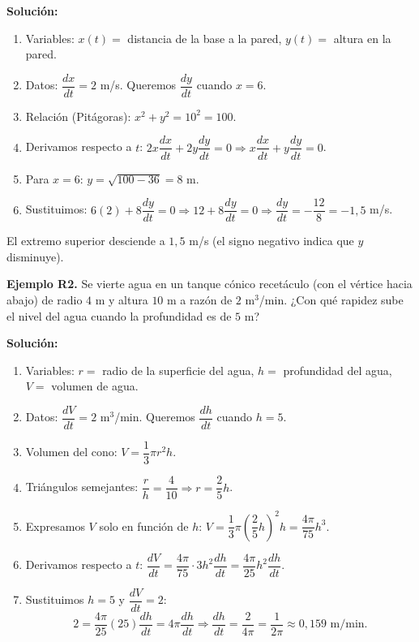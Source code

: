 \documentclass[12pt, letterpaper]{article}
\begin{document}
\begin{cuadrosolucion}
  \textbf{Solución:}
  \begin{enumerate}
    \item Variables: $x(t) =$ distancia de la base a la pared, $y(t) =$ altura en la pared.
    \item Datos: $\dfrac{dx}{dt} = 2$ m/s. Queremos $\dfrac{dy}{dt}$ cuando $x = 6$.
    \item Relación (Pitágoras): $x^2 + y^2 = 10^2 = 100$.
    \item Derivamos respecto a $t$: $2x \dfrac{dx}{dt} + 2y \dfrac{dy}{dt} = 0 \Rightarrow x \dfrac{dx}{dt} + y \dfrac{dy}{dt} = 0$.
    \item Para $x = 6$: $y = \sqrt{100 - 36} = 8$ m.
    \item Sustituimos: $6(2) + 8 \dfrac{dy}{dt} = 0 \Rightarrow 12 + 8 \dfrac{dy}{dt} = 0 \Rightarrow \dfrac{dy}{dt} = -\dfrac{12}{8} = -1{,}5$ m/s.
  \end{enumerate}
  El extremo superior desciende a $1{,}5$ m/s (el signo negativo indica que $y$ disminuye).
\end{cuadrosolucion}

\textbf{Ejemplo R2.} Se vierte agua en un tanque cónico recetáculo (con el vértice hacia abajo) de radio $4$ m y altura $10$ m a razón de $2$ m$^3$/min. ¿Con qué rapidez sube el nivel del agua cuando la profundidad es de $5$ m?

\begin{cuadrosolucion}
  \textbf{Solución:}
  \begin{enumerate}
    \item Variables: $r =$ radio de la superficie del agua, $h =$ profundidad del agua, $V =$ volumen de agua.
    \item Datos: $\dfrac{dV}{dt} = 2$ m$^3$/min. Queremos $\dfrac{dh}{dt}$ cuando $h = 5$.
    \item Volumen del cono: $V = \dfrac{1}{3}\pi r^2 h$.
    \item Triángulos semejantes: $\dfrac{r}{h} = \dfrac{4}{10} \Rightarrow r = \dfrac{2}{5}h$.
    \item Expresamos $V$ solo en función de $h$: $V = \dfrac{1}{3}\pi \left(\dfrac{2}{5}h\right)^2 h = \dfrac{4\pi}{75} h^3$.
    \item Derivamos respecto a $t$: $\dfrac{dV}{dt} = \dfrac{4\pi}{75} \cdot 3h^2 \dfrac{dh}{dt} = \dfrac{4\pi}{25} h^2 \dfrac{dh}{dt}$.
    \item Sustituimos $h = 5$ y $\dfrac{dV}{dt} = 2$:
          $$2 = \dfrac{4\pi}{25}(25) \dfrac{dh}{dt} = 4\pi \dfrac{dh}{dt} \Rightarrow \dfrac{dh}{dt} = \dfrac{2}{4\pi} = \dfrac{1}{2\pi} \approx 0{,}159 \text{ m/min}.$$
  \end{enumerate}
\end{cuadrosolucion}
\end{document}
